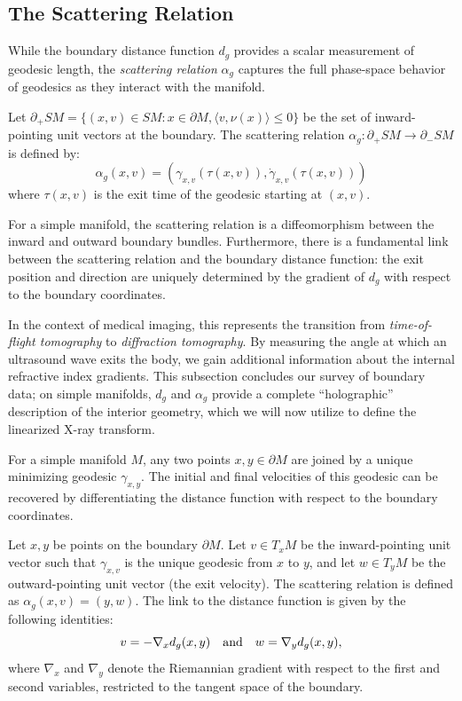 \subsection{The Scattering Relation} While the boundary distance function $d_g$ provides a scalar measurement of geodesic length, the \emph{scattering relation} $\alpha_g$ captures the full phase-space behavior of geodesics as they interact with the manifold.
\begin{definition}
  Let $\partial_+ SM = \{(x, v) \in SM : x \in \partial M, \langle v, \nu(x) \rangle \leq 0\}$ be the set of inward-pointing unit vectors at the boundary. The scattering relation $\alpha_g: \partial_+ SM \to \partial_- SM$ is defined by:
  \begin{equation}
    \alpha_g(x, v) = (\gamma_{x,v}(\tau(x,v)), \dot{\gamma}_{x,v}(\tau(x,v)))
  \end{equation}
  where $\tau(x,v)$ is the exit time of the geodesic starting at $(x,v)$.
\end{definition}

For a simple manifold, the scattering relation is a diffeomorphism between the inward and outward boundary bundles. Furthermore, there is a fundamental link between the scattering relation and the boundary distance function: the exit position and direction are uniquely determined by the gradient of $d_g$ with respect to the boundary coordinates. 

In the context of medical imaging, this represents the transition from \emph{time-of-flight tomography} to \emph{diffraction tomography}. By measuring the angle at which an ultrasound wave exits the body, we gain additional information about the internal refractive index gradients. This subsection concludes our survey of boundary data; on simple manifolds, $d_g$ and $\alpha_g$ provide a complete ``holographic'' description of the interior geometry, which we will now utilize to define the linearized X-ray transform.

For a simple manifold $M$, any two points $x, y \in \partial M$ are joined by a unique minimizing geodesic $\gamma_{x,y}$. The initial and final velocities of this geodesic can be recovered by differentiating the distance function with respect to the boundary coordinates.

Let $x, y$ be points on the boundary $\partial M$. Let $v \in T_x M$ be the inward-pointing unit vector such that $\gamma_{x,v}$ is the unique geodesic from $x$ to $y$, and let $w \in T_y M$ be the outward-pointing unit vector (the exit velocity). The scattering relation is defined as $\alpha_g(x, v) = (y, w)$. The link to the distance function is given by the following identities:
\[%
  v = -\nabla_x d_g(x, y) \aand w = \nabla_y d_g(x, y)
,\]%
where $\nabla_x$ and $\nabla_y$ denote the Riemannian gradient with respect to the first and second variables, restricted to the tangent space of the boundary.


